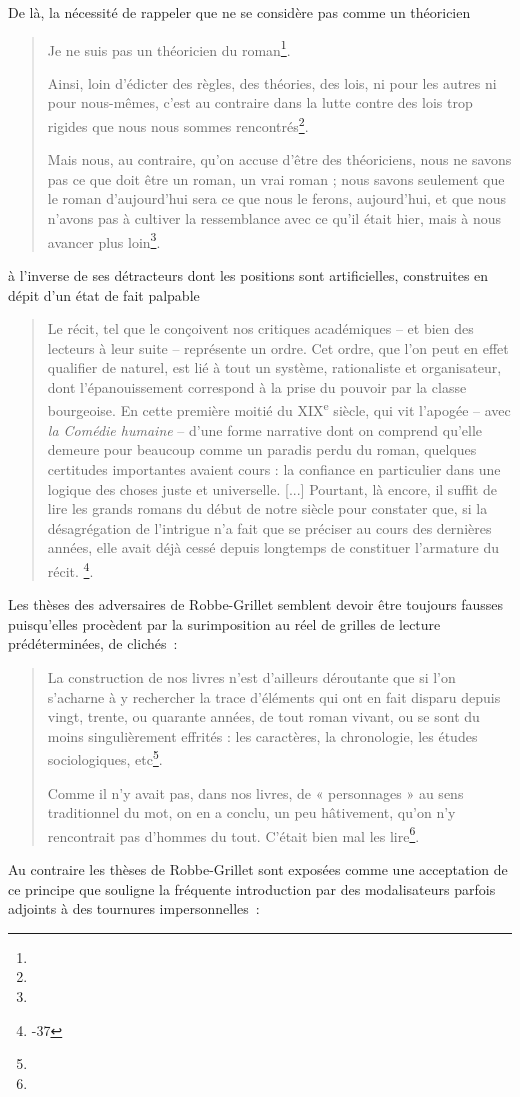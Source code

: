 \documentclass[12pt, a4paper]{article}
\begin{document}
De là, la nécessité de rappeler que \robbe{} ne se considère pas comme un théoricien
\begin{quote}
    Je ne suis pas un théoricien du roman\footnote{}.


    Ainsi, loin d’édicter des règles, des théories, des lois, ni pour les autres ni pour nous-mêmes, c’est au contraire dans la lutte contre des lois trop rigides que nous nous sommes rencontrés\footnote{}.

    Mais nous, au contraire, qu’on accuse d’être des théoriciens, nous ne savons pas ce que doit être un roman, un vrai roman ; nous savons seulement que le roman d’aujourd’hui sera ce que nous le ferons, aujourd’hui, et que nous n’avons pas à cultiver la ressemblance avec ce qu’il était hier, mais à nous avancer plus loin\footnote{}.
\end{quote}
à l'inverse de ses détracteurs dont les positions sont artificielles, construites en dépit d'un état de fait palpable
\begin{quote}
    Le récit, tel que le conçoivent nos critiques académiques – et bien des lecteurs à leur suite – représente un ordre. Cet ordre, que l’on peut en effet qualifier de naturel, est lié à tout un système, rationaliste et organisateur, dont l’épanouissement correspond à la prise du pouvoir par la classe bourgeoise. En cette première moitié du \textsc{XIX}\textsuperscript{e} siècle, qui vit l’apogée – avec \textit{la Comédie humaine} – d’une forme narrative dont on comprend qu’elle demeure pour beaucoup comme un paradis perdu du roman, quelques certitudes importantes avaient cours : la confiance en particulier dans une logique des choses juste et universelle.
    [...]
    Pourtant, là encore, il suffit de lire les grands romans du début de notre siècle pour constater que, si la désagrégation de l’intrigue n’a fait que se préciser au cours des dernières années, elle avait déjà cessé depuis longtemps de constituer l’armature du récit.
    \footnote{-37}.
\end{quote}
Les thèses des adversaires de Robbe-Grillet semblent devoir être toujours fausses puisqu'elles procèdent par la surimposition au réel de grilles de lecture prédéterminées, de clichés~:
\begin{quote}
    La construction de nos livres n’est d’ailleurs déroutante que si l’on s’acharne à y rechercher la trace d’éléments qui ont en fait disparu depuis vingt, trente, ou quarante années, de tout roman vivant, ou se sont du moins singulièrement effrités : les caractères, la chronologie, les études sociologiques, etc\footnote{}.

    Comme il n’y avait pas, dans nos livres, de « personnages » au sens traditionnel du mot, on en a conclu, un peu hâtivement, qu’on n’y rencontrait pas d’hommes du tout. C’était bien mal les lire\footnote{}.
\end{quote}
Au contraire les thèses de Robbe-Grillet sont exposées comme une acceptation de ce principe que souligne la fréquente introduction par des modalisateurs parfois adjoints à des tournures impersonnelles~:
\end{document}
